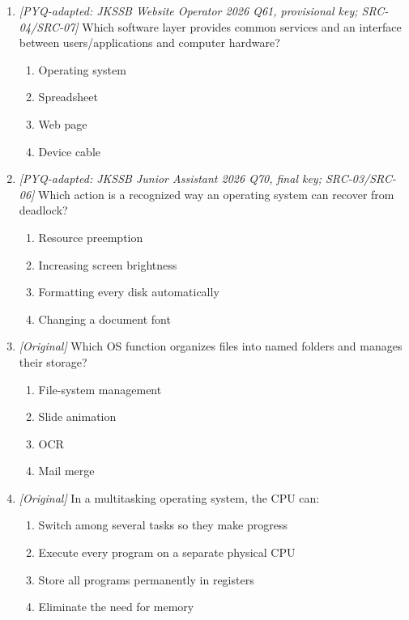 \begin{enumerate}[label=\textbf{Q\arabic*.}, leftmargin=*]
\begin{enumerate}[label=\Alph*.]
  \end{enumerate}
\item \textit{[PYQ-adapted: JKSSB Website Operator 2026 Q61, provisional key; SRC-04/SRC-07]} Which software layer provides common services and an interface between users/applications and computer hardware?
  \begin{enumerate}[label=\Alph*.]
\item Operating system
   \item Spreadsheet
   \item Web page
   \item Device cable
  \end{enumerate}

\item \textit{[PYQ-adapted: JKSSB Junior Assistant 2026 Q70, final key; SRC-03/SRC-06]} Which action is a recognized way an operating system can recover from deadlock?
  \begin{enumerate}[label=\Alph*.]
\item Resource preemption
   \item Increasing screen brightness
   \item Formatting every disk automatically
   \item Changing a document font
  \end{enumerate}

\item \textit{[Original]} Which OS function organizes files into named folders and manages their storage?
  \begin{enumerate}[label=\Alph*.]
\item File-system management
   \item Slide animation
   \item OCR
   \item Mail merge
  \end{enumerate}

\item \textit{[Original]} In a multitasking operating system, the CPU can:
  \begin{enumerate}[label=\Alph*.]
\item Switch among several tasks so they make progress
   \item Execute every program on a separate physical CPU
   \item Store all programs permanently in registers
   \item Eliminate the need for memory
  \end{enumerate}


\end{enumerate}
